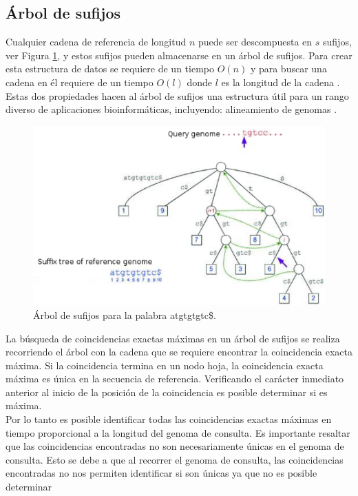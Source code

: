 \documentclass[12pt,a4paper]{article}
\begin{document}
\subsection{Árbol de sufijos}
\indent
 Cualquier cadena de referencia de longitud $n$ puede ser descompuesta en $s$ sufijos, ver
 Figura \ref{fig:st}, y estos sufijos pueden almacenarse en un árbol de sufijos.
 Para crear esta estructura de datos se requiere de un tiempo $O(n)$ y para
 buscar una cadena en él requiere de un tiempo $O(l)$ donde $l$ es la longitud
 de la cadena \cite{Gusfield2007Algorithms}. Estas dos propiedades hacen al árbol
 de sufijos una estructura útil para un rango diverso de aplicaciones
 bioinformáticas, incluyendo: alineamiento de genomas \cite{Mummer3}.\\
   \begin{figure}[h] 
   \centering 
   \includegraphics[scale=0.8]{st-mum.png} 
   \caption{Árbol de sufijos para la palabra atgtgtgtc\$.} 
   \label{fig:st} 
 \end{figure}
\indent
La búsqueda de coincidencias exactas máximas en un árbol de sufijos se realiza recorriendo el árbol
con la cadena que se requiere encontrar la coincidencia exacta máxima. Si la coincidencia termina en 
un nodo hoja, la coincidencia exacta máxima es única en la secuencia de referencia. Verificando el 
carácter inmediato anterior al inicio de la posición de la coincidencia es posible determinar si es
máxima.\\
\indent
Por lo tanto es posible identificar todas las coincidencias exactas máximas en tiempo proporcional a
la longitud del genoma de consulta. Es importante resaltar que las coincidencias encontradas no son
necesariamente únicas en el genoma de consulta. Esto se debe a que al recorrer el genoma de consulta, 
las coincidencias encontradas no nos permiten identificar si son únicas ya que no es posible determinar
\end{document}
